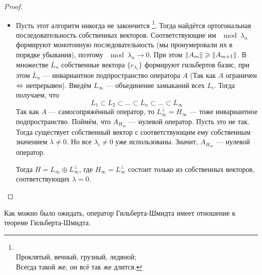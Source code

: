 \documentclass[12pt]{article}
\begin{document}
\begin{proof}
\begin{itemize}
		\item Пусть этот алгоритм никогда не закончится
			\footnote
			{
				\\
				Проклятый, вечный, грузный, ледяной; \\
				Всегда такой же, он всё так же длится.
			}.
			Тогда найдётся ортогональная последовательность собственных векторов. Соответствующие им $\mod{\lambda_n}$ 
			формируют монотонную последовательность {\color{gray}(мы пронумеровали их в порядке убывания)}, поэтому 
			$\mod{\lambda_n} \rightarrow 0$. При этом 
			$\left\| A_m \right\| \geqslant \left\| A_{m+1} \right\|$. В множестве $\overline{L}_n$ собственные вектора $\{e_{\lambda_i}\}$ 
			формируют гильбертов базис, при этом $\overline{L}_n$ --- инвариантное подпространство оператора
			$A$ (Так как $A$ ограничен $\Leftrightarrow$ непрерывен). Введём $L_{\infty}$ --- объединение 
			замыканий всех $L_i$. Тогда получаем, что
			$$L_1 \subset L_2 \subset \dots \subset L_n \subset \dots \subset L_{\infty}$$
			Так как $A$ --- самосопряжённый оператор, то $L^{\perp}_{\infty} = H_{\infty}$ --- тоже инвариантное 
			подпространство. Поймём, что $A_{H_{\infty}}$ --- нулевой оператор. Пусть это не так. Тогда существует
			собственный вектор с соответствующим ему собственным значением $\lambda \neq 0$. Но все
			$\lambda_i \neq 0$ уже использованы. Значит, $A_{H_{\infty}}$ --- нулевой оператор.
			
			Тогда $H = L_{\infty} \oplus L^{\perp}_{\infty}$, где $H_{\infty} = L^{\perp}_{\infty}$ состоит только
			из собственных векторов, соответствующих $\lambda = 0$.
		\end{itemize}
	\end{proof}
	
	Как можно было ожидать, оператор Гильберта-Шмидта имеет отношение к теореме Гильберта-Шмидта.
	
\end{document}
